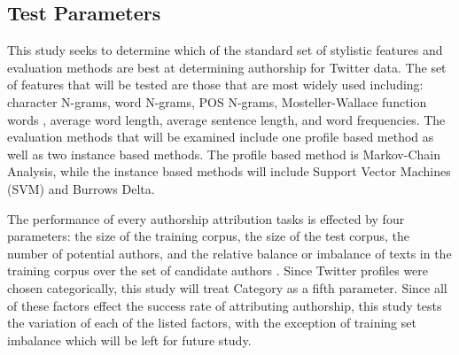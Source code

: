 \documentclass[pageno]{jpaper}
\begin{document}
\subsection{Test Parameters}
\label{sec:testParameters}
This study seeks to determine which of the standard set of stylistic features and evaluation methods are best at determining authorship for Twitter data.  The set of features that will be tested are those that are most widely used including: character N-grams, word N-grams, POS N-grams, Mosteller-Wallace function words \cite{MWFunction}, average word length, average sentence length, and word frequencies.
The evaluation methods that will be examined include one profile based method as well as two instance based methods.  The profile based method is Markov-Chain Analysis, while the instance based methods will include Support Vector Machines (SVM) and Burrows Delta.

The performance of every authorship attribution tasks is effected by four parameters: the size of the training corpus, the size of the test corpus, the number of potential authors, and the relative balance or imbalance of texts in the training corpus over the set of candidate authors \cite{survey}.  Since Twitter profiles were chosen categorically, this study will treat Category as a fifth parameter.  Since all of these factors effect the success rate of attributing authorship, this study tests the variation of each of the listed factors, with the exception of training set imbalance which will be left for future study.
\end{document}
